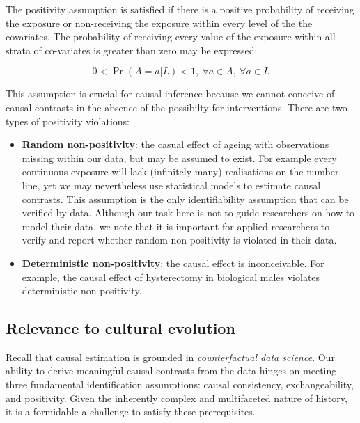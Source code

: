 \documentclass[
  singlecolumn]{report}
\begin{document}
The positivity assumption is satisfied if there is a positive
probability of receiving the exposure or non-receiving the exposure
within every level of the the covariates. The probability of receiving
every value of the exposure within all strata of co-variates is greater
than zero may be expressed:

\begin{equation}
0 < \Pr(A=a|L)<1, ~ \forall a \in A, ~ \forall a \in L
\end{equation}

This assumption is crucial for causal inference because we cannot
conceive of causal contrasts in the absence of the possibilty for
interventions. There are two types of positivity violations:

\begin{itemize}
\item
  \textbf{Random non-positivity}: the casual effect of ageing with
  observations missing within our data, but may be assumed to exist. For
  example every continuous exposure will lack (infinitely many)
  realisations on the number line, yet we may nevertheless use
  statistical models to estimate causal contrasts. This assumption is
  the only identifiability assumption that can be verified by data.
  Although our task here is not to guide researchers on how to model
  their data, we note that it is important for applied researchers to
  verify and report whether random non-positivity is violated in their
  data.
\item
  \textbf{Deterministic non-positivity}: the causal effect is
  inconceivable. For example, the causal effect of hysterectomy in
  biological males violates deterministic non-positivity.
\end{itemize}

\hypertarget{relevance-to-cultural-evolution}{%
\subsection{Relevance to cultural
evolution}\label{relevance-to-cultural-evolution}}

Recall that causal estimation is grounded in \emph{counterfactual data
science}. Our ability to derive meaningful causal contrasts from the
data hinges on meeting three fundamental identification assumptions:
causal consistency, exchangeability, and positivity. Given the
inherently complex and multifaceted nature of history, it is a
formidable a challenge to satisfy these prerequisites.
\end{document}
